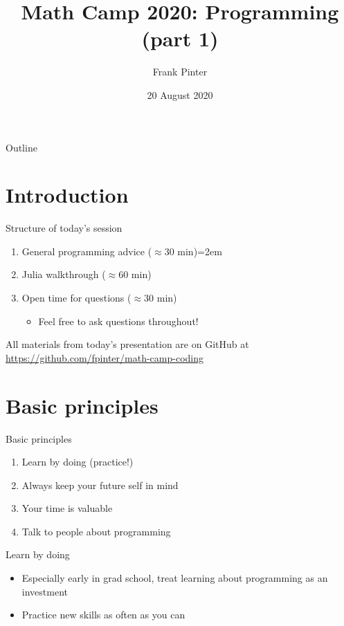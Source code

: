 \documentclass{beamer}
\title{Math Camp 2020: Programming (part 1)}
\author{Frank Pinter}
\date{20 August 2020}
\begin{document}
\begin{frame}
  \titlepage
\end{frame}

\begin{frame}{Outline}
  \tableofcontents
\end{frame}

\section*{Introduction}

\begin{frame}{Structure of today's session}
\begin{enumerate}
    \item General programming advice ($\approx 30$ min)\itemsep=2em
    \item Julia walkthrough ($\approx 60$ min)
    \item Open time for questions ($\approx 30$ min)
    \begin{itemize}
        \item Feel free to ask questions throughout!
    \end{itemize}
\end{enumerate}
All materials from today's presentation are on GitHub at \\
\url{https://github.com/fpinter/math-camp-coding}
\end{frame}

\section{Basic principles}

\begin{frame}{Basic principles}
    \begin{enumerate}
        \item Learn by doing (practice!)
        \item Always keep your future self in mind
        \item Your time is valuable
        \item Talk to people about programming
    \end{enumerate}
\end{frame}

\begin{frame}{Learn by doing}
    \begin{itemize}
        \item Especially early in grad school, treat learning about programming as an investment
        \item Practice new skills as often as you can
    \end{itemize}
\end{frame}
\end{document}
